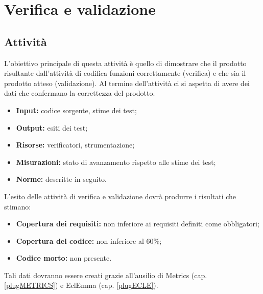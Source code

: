 \section{Verifica e validazione}
\subsection{Attività}{
L'obiettivo principale di questa attività è quello di dimostrare che il prodotto risultante dall'attività di codifica funzioni correttamente (verifica) e che sia il prodotto atteso (validazione).
Al termine dell'attività ci si aspetta di avere dei dati che confermano la correttezza del prodotto.
\begin{itemize}
\item [] \textbf{Input:} codice sorgente, stime dei test;
\item [] \textbf{Output:} esiti dei test;
\item [] \textbf{Risorse:} verificatori, strumentazione;
\item [] \textbf{Misurazioni:} stato di avanzamento rispetto alle stime dei test;
\item [] \textbf{Norme:} descritte in seguito.
\end{itemize}
L'esito delle attività di verifica e validazione dovrà produrre i risultati che stimano:
\begin{itemize}
\item \textbf{Copertura dei requisiti:} non inferiore ai requisiti definiti come obbligatori;
\item \textbf{Copertura del codice:} non inferiore al 60\%;
\item \textbf{Codice morto:} non presente.
\end{itemize}
Tali dati dovranno essere creati grazie all'ausilio di Metrics (cap. \ref{plugMETRICS}) e EclEmma (cap. \ref{plugECLE}).
}

